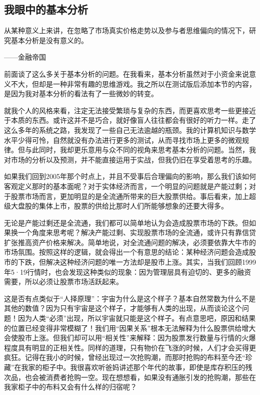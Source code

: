 \subsection{我眼中的基本分析}

{\kaishu
从某种意义上来讲，在忽略了市场真实价格走势以及参与者思维偏向的情况下，研究基本分析是没有意义的。

\hfill ——金融帝国
}

前面谈了这么多关于基本分析的问题。在我看来，基本分析虽然对于小资金来说意义不大，但却是一种非常有趣的思维游戏。我之所以在测试版后添加本节的内容，是因为我对基本分析的看法有了一些微妙的转变。

就我个人的风格来看，注定无法接受繁琐与复杂的东西，而更喜欢思考一些更接近于本质的东西。或许这并不是巧合，就好像盲人往往都会有很好的听力一样。走了这么多年的系统之路，我发现了一些自己无法逾越的瓶颈。我的计算机知识与数学水平少得可怜，自然就没有办法进行更多的测试，从而寻找市场上更多的微观规律。但与此同时，我却更乐意用与众不同的视角来思考基本分析的问题。当然，我对市场的分析以及预测，并不能直接运用于实战，但我仍旧在享受着思考的乐趣。

如果我们回到2005年那个时点上，并且不受事后合理偏向的影响，那么我们该如何客观定义那时的基本面呢？对于实体经济而言，一个明显的问题就是产能过剩；对于股票市场而言，更加明显的是全流通所带来的巨大股票供给。事后看来，加上超级大盘股的集体上市，股票的供给比那时人们所能够想象的还要大得多。

无论是产能过剩还是全流通，我们都可以简单地认为会造成股票市场的下跌。但如果换一个角度来思考呢？解决产能过剩、实现股票市场的全流通，或许只有靠信贷扩张推高资产价格来解决。简单地说，对全流通问题的解决，必须要依靠大牛市的市场氛围。按照这样的逻辑，就会得出一个有意思的结论：某种经济问题会造成股市的下跌，但解决这种经济问题的唯一方法却是股市上涨。其实，当我们回顾1999年5·19行情时，也会发现这种类似的现象：因为管理层具有迫切的、更多的融资需要，所以必须让股票市场活跃起来。

这是否有点类似于“人择原理”：宇宙为什么是这个样子？基本自然常数为什么不是其他的数值？因为只有宇宙是这个样子，才能够有人类的出现，从而谈论这个问题！因为人类“必须”出现，所以宇宙就只能是这个样子。有点意思吧，原因和结果的位置已经变得非常模糊了！我们用“因果关系”根本无法解释为什么股票供给增大会使股市上涨。但我们却可以用“相关性”来解释：因为股票发行数量与行情的火爆程度具有明显的正相关性。同样的道理，只有物价在飞涨的时候，人们才会买得更疯狂。记得在我小的时候，曾经出现过一次抢购潮，而那时抢购的布料至今还“珍藏”在我家的柜子中。我很喜欢听爸妈讲述那个年代的故事，即使是库存积压的残次品，也会被消费者抢购一空。现在想想看，如果没有通胀引发的抢购潮，那些在我家柜子中的布料又会有什么样的归宿呢？


